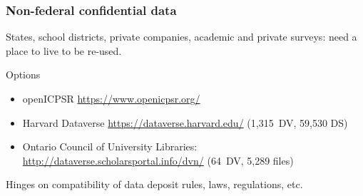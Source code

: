 \begin{frame}
	\frametitle{Non-federal confidential data}
	States, school districts, private companies, academic and private surveys: need a place to live to be re-used.
	\begin{block}{Options}
		\begin{itemize}
			\item openICPSR \url{https://www.openicpsr.org/}
			\item Harvard Dataverse \url{https://dataverse.harvard.edu/} {\footnotesize (1,315\ DV, 59,530 DS)}
			\item Ontario Council of University Libraries: \url{http://dataverse.scholarsportal.info/dvn/} {\footnotesize (64\ DV, 5,289 files)}
		\end{itemize}
	\end{block}
	Hinges on compatibility of data deposit rules, laws, regulations, etc.
\end{frame}



